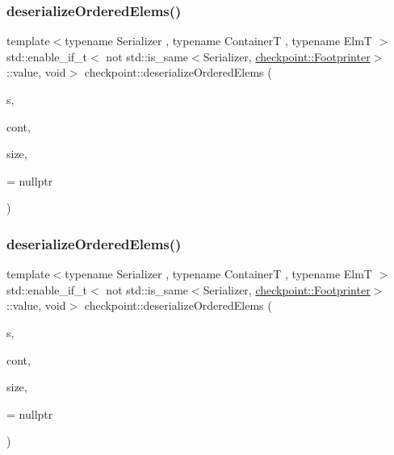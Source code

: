 \subsubsection{\texorpdfstring{deserialize\+Ordered\+Elems()}{deserializeOrderedElems()}\hspace{0.1cm}{\footnotesize\ttfamily [1/3]}}
{\footnotesize\ttfamily template$<$typename Serializer , typename ContainerT , typename ElmT $>$ \\
std\+::enable\+\_\+if\+\_\+t$<$ not std\+::is\+\_\+same$<$Serializer, \hyperlink{structcheckpoint_1_1_footprinter}{checkpoint\+::\+Footprinter}$>$\+::value, void$>$ checkpoint\+::deserialize\+Ordered\+Elems (\begin{DoxyParamCaption}\item[{Serializer \&}]{s,  }\item[{ContainerT \&}]{cont,  }\item[{typename Container\+T\+::size\+\_\+type}]{size,  }\item[{\hyperlink{namespacecheckpoint_a60a9850fa59d4b236b2f888baf135a95}{is\+Copy\+Constructible}$<$ ElmT $>$ $\ast$}]{ = {\ttfamily nullptr} }\end{DoxyParamCaption})\hspace{0.3cm}{\ttfamily [inline]}}

\mbox{\label{namespacecheckpoint_abec445c1387cfe9c00c3c328b403378b}} 
\subsubsection{\texorpdfstring{deserialize\+Ordered\+Elems()}{deserializeOrderedElems()}\hspace{0.1cm}{\footnotesize\ttfamily [2/3]}}
{\footnotesize\ttfamily template$<$typename Serializer , typename ContainerT , typename ElmT $>$ \\
std\+::enable\+\_\+if\+\_\+t$<$ not std\+::is\+\_\+same$<$Serializer, \hyperlink{structcheckpoint_1_1_footprinter}{checkpoint\+::\+Footprinter}$>$\+::value, void$>$ checkpoint\+::deserialize\+Ordered\+Elems (\begin{DoxyParamCaption}\item[{Serializer \&}]{s,  }\item[{ContainerT \&}]{cont,  }\item[{typename Container\+T\+::size\+\_\+type}]{size,  }\item[{\hyperlink{namespacecheckpoint_a141a100f9dcca06fb0b6dbf44a5d6756}{is\+Not\+Copy\+Constructible}$<$ ElmT $>$ $\ast$}]{ = {\ttfamily nullptr} }\end{DoxyParamCaption})\hspace{0.3cm}{\ttfamily [inline]}}

